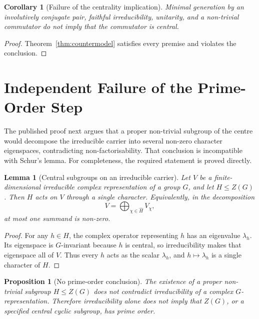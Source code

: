 \documentclass[11pt,a4paper]{article}
\newtheorem{lemma}[theorem]{Lemma}
\newtheorem{proposition}[theorem]{Proposition}
\newtheorem{corollary}[theorem]{Corollary}
\begin{document}
\begin{corollary}[Failure of the centrality implication]
\label{cor:centrality}
Minimal generation by an involutively conjugate pair, faithful irreducibility, unitarity, and a non-trivial
commutator do not imply that the commutator is central.
\end{corollary}

\begin{proof}
Theorem~\ref{thm:countermodel} satisfies every premise and violates the conclusion.
\end{proof}

\section{Independent Failure of the Prime-Order Step}
\label{sec:schur}

The published proof next argues that a proper non-trivial subgroup of the centre would decompose the
irreducible carrier into several non-zero character eigenspaces, contradicting non-factorisability.
That conclusion is incompatible with Schur's lemma.
For completeness, the required statement is proved directly.

\begin{lemma}[Central subgroups on an irreducible carrier]
\label{lem:central-character}
Let \(V\) be a finite-dimensional irreducible complex representation of a group \(G\), and let
\(H\leq Z(G)\).
Then \(H\) acts on \(V\) through a single character.
Equivalently, in the decomposition
\[
V=\bigoplus_{\chi\in\widehat H}V_\chi,
\]
at most one summand is non-zero.
\end{lemma}

\begin{proof}
For any \(h\in H\), the complex operator representing \(h\) has an eigenvalue \(\lambda_h\).
Its eigenspace is \(G\)-invariant because \(h\) is central, so irreducibility makes that eigenspace all of
\(V\).
Thus every \(h\) acts as the scalar \(\lambda_h\), and \(h\mapsto\lambda_h\) is a single character of \(H\).
\end{proof}

\begin{proposition}[No prime-order conclusion]
\label{prop:no-prime}
The existence of a proper non-trivial subgroup \(H\leq Z(G)\) does not contradict irreducibility of a complex
\(G\)-representation.
Therefore irreducibility alone does not imply that \(Z(G)\), or a specified central cyclic subgroup, has
prime order.
\end{proposition}
\end{document}

